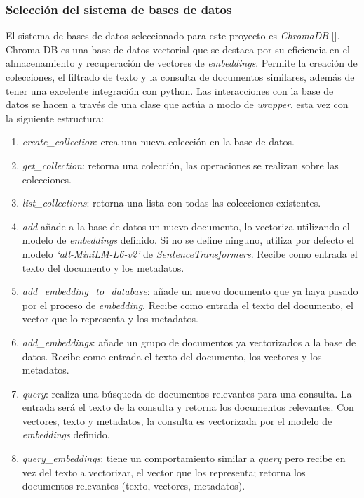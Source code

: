         \subsubsection{Selección del sistema de bases de datos}
            El sistema de bases de datos seleccionado para este proyecto es \emph{ChromaDB} [\cite{chromadb}]. Chroma DB es una base de datos vectorial que se destaca por su eficiencia en el almacenamiento y recuperación de vectores de \emph{embeddings}. Permite la creación de colecciones, el filtrado de texto y la consulta de documentos similares, además de tener una excelente integración con python.
        Las interacciones con la base de datos se hacen a través de una clase que actúa a modo de \emph{wrapper}, esta vez con la siguiente estructura:
        \begin{enumerate}
            \item \emph{create\_collection}: crea una nueva colección en la base de datos.
            \item \emph{get\_collection}: retorna una colección, las operaciones se realizan sobre las colecciones.
            \item \emph{list\_collections}: retorna una lista con todas las colecciones existentes.
            \item \emph{add} añade a la base de datos un nuevo documento, lo vectoriza utilizando el modelo de \emph{embeddings} definido. Si no se define ninguno, utiliza por defecto el modelo \emph{`all-MiniLM-L6-v2'} de \emph{SentenceTransformers}. Recibe como entrada el texto del documento y los metadatos.
            \item \emph{add\_embedding\_to\_database}: añade un nuevo documento que ya haya pasado por el proceso de \emph{embedding}. Recibe como entrada el texto del documento, el vector que lo representa y los metadatos.
            \item \emph{add\_embeddings}: añade un grupo de documentos ya vectorizados a la base de datos. Recibe como entrada el texto del documento, los vectores y los metadatos. 
            \item \emph{query}: realiza una búsqueda de documentos relevantes para una consulta. La entrada será el texto  de la consulta y retorna los documentos relevantes. Con vectores, texto y metadatos, la consulta es vectorizada por el modelo de \emph{embeddings} definido.
            \item \emph{query\_embeddings}: tiene un comportamiento similar a \emph{query} pero recibe en vez del texto a vectorizar, el vector que los representa; retorna los documentos relevantes (texto, vectores, metadatos).
        \end{enumerate}

